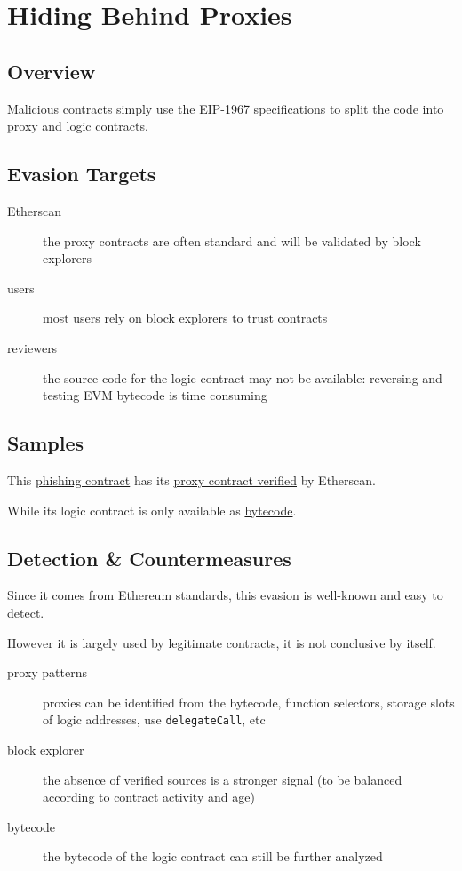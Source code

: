 \section{Hiding Behind Proxies} \label{sec:hiding-behind-proxies}

\subsection{Overview}

Malicious contracts simply use the EIP-1967 \cite{eip-1967} specifications to split the code into proxy and logic contracts.

\subsection{Evasion Targets}

\begin{description}
\item[Etherscan]{the proxy contracts are often standard and will be validated by block explorers}
\item[users]{most users rely on block explorers to trust contracts}
\item[reviewers]{the source code for the logic contract may not be available: reversing and testing EVM bytecode is time consuming}
\end{description}

\subsection{Samples}

This \href{}{phishing contract} has its \href{}{proxy contract verified} by Etherscan.

While its logic contract is only available as \href{}{bytecode}.

\subsection{Detection \& Countermeasures}

Since it comes from Ethereum standards, this evasion is well-known and easy to detect.

However it is largely used by legitimate contracts, it is not conclusive by itself.

\begin{description}
\item[proxy patterns]{proxies can be identified from the bytecode, function selectors, storage slots of logic addresses, use \lstinline{delegateCall}, etc}
\item[block explorer]{the absence of verified sources is a stronger signal (to be balanced according to contract activity and age)}
\item[bytecode]{the bytecode of the logic contract can still be further analyzed}
\end{description}

